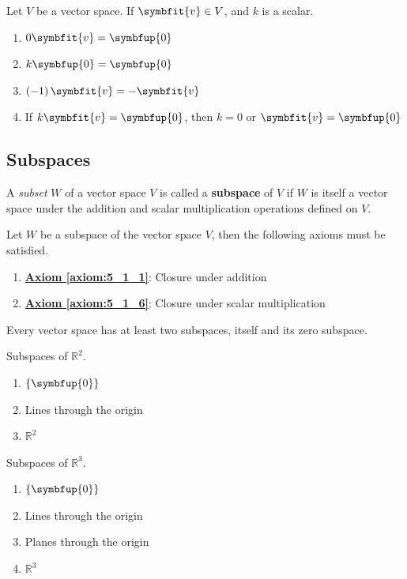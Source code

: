 \documentclass{article}
\begin{document}
	\begin{theorem}
		Let $V$ be a vector space. If $\symbfit{v} \in V$, and $k$ is a scalar.
		\begin{enumerate}
			\item $0\symbfit{v}=\symbfup{0}$
			\item $k\symbfup{0}=\symbfup{0}$
			\item $\left(-1\right)\symbfit{v}=-\symbfit{v}$
			\item If $k\symbfit{v}=\symbfup{0}$, then $k=0$ or $\symbfit{v}=\symbfup{0}$
		\end{enumerate}
	\end{theorem}
	\subsection{Subspaces}
	\begin{definition}
		A \textit{subset} $W$ of a vector space $V$ is called a \textbf{subspace} of $V$ if $W$ is itself a vector space under the addition and scalar multiplication operations defined on $V$. 
	\end{definition}
	\begin{theorem}
		Let $W$ be a subspace of the vector space $V$, then the following axioms must be satisfied.
		\begin{enumerate}
			\item \textbf{\hyperref[axiom:5_1_1]{Axiom \ref{axiom:5_1_1}}}: Closure under addition
			\item \textbf{\hyperref[axiom:5_1_6]{Axiom \ref{axiom:5_1_6}}}: Closure under scalar multiplication
		\end{enumerate}
	\end{theorem}
	\begin{theorem}
		Every vector space has at least two subspaces, itself and its zero subspace.
	\end{theorem}
	\begin{theorem}
		Subspaces of $\mathbb{R}^2$.
		\begin{enumerate}
			\item $\left\{ \symbfup{0} \right\}$
			\item Lines through the origin
			\item $\mathbb{R}^2$
		\end{enumerate}
	\end{theorem}
	\begin{theorem}
		Subspaces of $\mathbb{R}^3$.
		\begin{enumerate}
			\item $\left\{ \symbfup{0} \right\}$
			\item Lines through the origin
			\item Planes through the origin
			\item $\mathbb{R}^3$
		\end{enumerate}
	\end{theorem}
\end{document}
